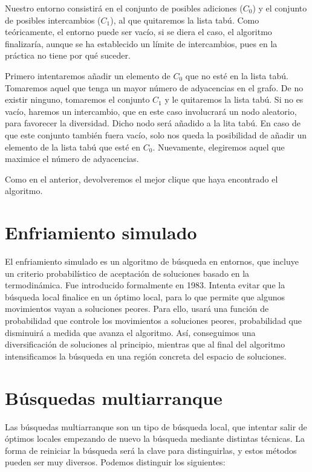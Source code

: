Nuestro entorno consistirá en el conjunto de posibles adiciones ($C_0$) y el conjunto de
posibles intercambios ($C_1$), al que quitaremos la lista tabú. Como teóricamente, el entorno
puede ser vacío, si se diera el caso, el algoritmo finalizaría, aunque se ha establecido un
límite de intercambios, pues en la práctica no tiene por qué suceder.

Primero intentaremos añadir un elemento de $C_0$ que no esté en la lista tabú. Tomaremos aquel
que tenga un mayor número de adyacencias en el grafo. De no existir ninguno, tomaremos el conjunto
$C_1$ y le quitaremos la lista tabú. Si no es vacío, haremos un intercambio, que en este caso
involucrará un nodo aleatorio, para favorecer la diversidad. Dicho nodo será añadido a la lita tabú.
En caso de que este conjunto también fuera vacío, solo nos queda la posibilidad de añadir un
elemento de la lista tabú que esté en $C_0$. Nuevamente, elegiremos aquel que maximice el número
de adyacencias.

Como en el anterior, devolveremos el mejor clique que haya encontrado el algoritmo.


\section{Enfriamiento simulado}

El enfriamiento simulado es un algoritmo de búsqueda en entornos, que incluye un criterio probabilístico
de aceptación de soluciones basado en la termodinámica. Fue introducido formalmente en 1983.
Intenta evitar que la búsqueda local finalice en un óptimo local, para lo que permite que algunos
movimientos vayan a soluciones peores. Para ello, usará una función de probabilidad que controle
los movimientos a soluciones peores, probabilidad que disminuirá a medida que avanza el algoritmo.
Así, conseguimos una diversificación de soluciones al principio, mientras que al final del algoritmo
intensificamos la búsqueda en una región concreta del espacio de soluciones.


\section{Búsquedas multiarranque}

Las búsquedas multiarranque son un tipo de búsqueda local, que intentar salir de óptimos locales
empezando de nuevo la búsqueda mediante distintas técnicas. La forma de reiniciar la búsqueda será
la clave para distinguirlas, y estos métodos pueden ser muy diversos. Podemos distinguir los siguientes:

